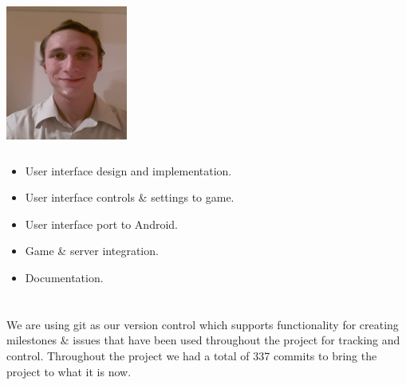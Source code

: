 \documentclass[letterpaper]{article}
\begin{document}
		\begin{minipage}[l]{0.23\textwidth}
			\begin{flushleft}
				\includegraphics[width=40mm,height=50mm]{Members/Gerhard.jpg}
			\end{flushleft}
		\end{minipage}
		\begin{minipage}[r]{0.75\textwidth}
				\begin{itemize}
					\item User interface design and implementation.
					\item User interface controls \& settings to game.
					\item User interface port to Android.
					\item Game \& server integration.
					\item Documentation.
				\end{itemize}
		\end{minipage}
		
		\vspace{0.2in}
	\section*{\colorbox{black}{}} 
		\vspace{0.1in}
		
		We are using git as our version control which supports functionality for creating milestones \& issues that have been used throughout the project for tracking and control. Throughout the project we had a total of 337 commits to bring the project to what it is now.
			
\end{document}

